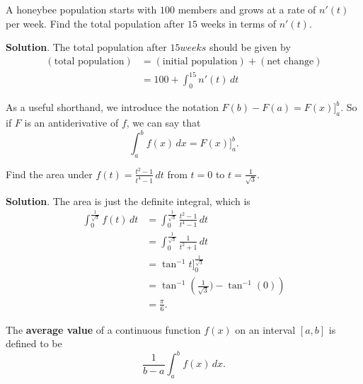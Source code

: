 \documentclass[10pt,]{book}
\newcommand{\terminology}[1]{\textbf{#1}}
\theoremstyle{ptxplainnotitle}
\theoremstyle{ptxplaintitle}
\theoremstyle{ptxplainnotitle}
\theoremstyle{ptxplaintitle}
\theoremstyle{ptxplainnotitle}
\theoremstyle{ptxplaintitle}
\theoremstyle{ptxdefinitionnotitle}
\theoremstyle{ptxdefinitiontitle}
\theoremstyle{ptxdefinitionnotitle}
\theoremstyle{ptxdefinitiontitle}
\theoremstyle{ptxdefinitionnotitle}
\theoremstyle{ptxdefinitiontitle}
\theoremstyle{ptxdefinitionnotitle}
\theoremstyle{ptxdefinitiontitle}
\theoremstyle{ptxdefinitionnotitle}
\theoremstyle{ptxdefinitiontitle}
\numberwithin{equation}{section}
\begin{document}
\begin{example}\label{example-modeling-a-population}
\hypertarget{p-447}{}%
A honeybee population starts with \(100\) members and grows at a rate of \(n'(t)\) per week. Find the total population after \(15\) weeks in terms of \(n'(t)\).%
\par\smallskip%
\noindent\textbf{Solution}.\hypertarget{solution-97}{}\quad%
\hypertarget{p-448}{}%
The total population after \(15 weeks\) should be given by%
\begin{align*}
(\text{total population}) & = (\text{initial population}) + (\text{net change}) \\
& = 100 + \int_{0}^{15}n'(t)\,dt 
\end{align*}
%
\end{example}
\hypertarget{p-449}{}%
As a useful shorthand, we introduce the notation \(F(b) - F(a) = F(x)\big]_{a}^{b}.\) So if \(F\) is an antiderivative of \(f\), we can say that%
\begin{equation*}
\int_{a}^{b}f(x)\,dx = F(x)\big]_{a}^{b}.
\end{equation*}
%
\begin{example}\label{example-area-under-a-rational-function}
\hypertarget{p-450}{}%
Find the area under \(f(t) = \frac{t^{2}-1}{t^{4}-1}\,dt\) from \(t=0\) to \(t=\frac{1}{\sqrt{3}}\).%
\par\smallskip%
\noindent\textbf{Solution}.\hypertarget{solution-98}{}\quad%
\hypertarget{p-451}{}%
The area is just the definite integral, which is%
\begin{align*}
\int_{0}^{\frac{1}{\sqrt{3}}}f(t)\,dt & = \int_{0}^{\frac{1}{\sqrt{3}}}\frac{t^{2}-1}{t^{4}-1}\,dt \\
& = \int_{0}^{\frac{1}{\sqrt{3}}}\frac{1}{t^{2}+1}\,dt \\
& = \tan^{-1}t\big]_{0}^{\frac{1}{\sqrt{3}}} \\
& = \tan^{-1}\left(\frac{1}{\sqrt{3}}) - \tan^{-1}(0)\right) \\
& = \frac{\pi}{6}. 
\end{align*}
%
\end{example}
\hypertarget{p-452}{}%
The \terminology{average value} of a continuous function \(f(x)\) on an interval \([a,b]\) is defined to be%
\begin{equation*}
\frac{1}{b-a}\int_{a}^{b}f(x)\,dx.
\end{equation*}
%
\end{document}
